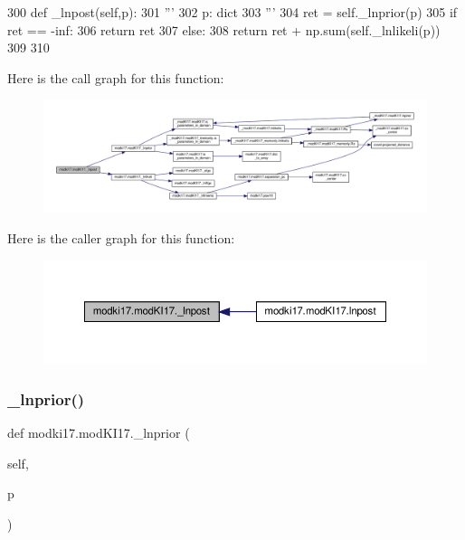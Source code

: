 \begin{DoxyCode}
300     \textcolor{keyword}{def }\_lnpost(self,p):
301         \textcolor{stringliteral}{'''}
302 \textcolor{stringliteral}{        p: dict}
303 \textcolor{stringliteral}{        '''}
304         ret = self.\_lnprior(p)
305         \textcolor{keywordflow}{if} ret == -inf:
306             \textcolor{keywordflow}{return} ret
307         \textcolor{keywordflow}{else}:
308             \textcolor{keywordflow}{return} ret + np.sum(self.\_lnlikeli(p)) 
309         
310         
\end{DoxyCode}
Here is the call graph for this function\+:\nopagebreak
\begin{figure}[H]
\begin{center}
\leavevmode
\includegraphics[width=350pt]{df/da3/classmodki17_1_1modKI17_a13262c1d5c53fa14ca3e74df3bcfd7bf_cgraph}
\end{center}
\end{figure}
Here is the caller graph for this function\+:\nopagebreak
\begin{figure}[H]
\begin{center}
\leavevmode
\includegraphics[width=350pt]{df/da3/classmodki17_1_1modKI17_a13262c1d5c53fa14ca3e74df3bcfd7bf_icgraph}
\end{center}
\end{figure}
\mbox{\label{classmodki17_1_1modKI17_afbd9170967100bb7fefe8cef8cfcd520}} 
\subsubsection{\texorpdfstring{\+\_\+lnprior()}{\_lnprior()}}
{\footnotesize\ttfamily def modki17.\+mod\+K\+I17.\+\_\+lnprior (\begin{DoxyParamCaption}\item[{}]{self,  }\item[{}]{p }\end{DoxyParamCaption})\hspace{0.3cm}{\ttfamily [private]}}

